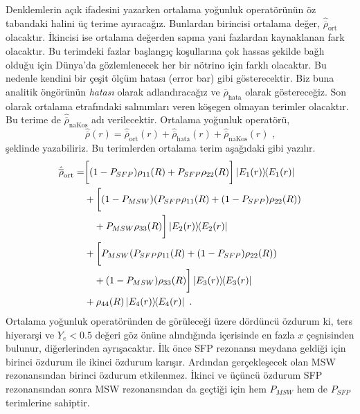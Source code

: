 Denklemlerin açık ifadesini yazarken ortalama yoğunluk operatörünün öz tabandaki halini üç terime ayıracağız. Bunlardan birincisi ortalama değer, $ \hat{\overline{\rho}}_{\text{ort}} $ olacaktır. İkincisi ise ortalama değerden sapma yani fazlardan kaynaklanan fark olacaktır. Bu terimdeki fazlar başlangıç koşullarına çok hassas şekilde bağlı olduğu için Dünya'da gözlemlenecek her bir nötrino için farklı olacaktır. Bu nedenle kendini bir çeşit ölçüm hatası (error bar) gibi gösterecektir. Biz buna analitik öngörünün \emph{hatası} olarak adlandıracağız ve $ \hat{\overline{\rho}}_{\text{hata}} $ olarak göstereceğiz. Son olarak ortalama etrafındaki salınımları veren köşegen olmayan terimler olacaktır. Bu terime de $ \hat{\overline{\rho}}_{\text{naKos}} $ adı verilecektir. Ortalama yoğunluk operatörü,
\begin{equation} \label{eqn:ortYogun1}
    \hat{\overline{\rho}}(r) = \hat{\overline{\rho}}_{\text{ort}}(r) + \hat{\overline{\rho}}_{\text{hata}}(r) + \hat{\overline{\rho}}_{\text{naKos}}(r) \text{ ,}
\end{equation}
şeklinde yazabiliriz. Bu terimlerden ortalama terim aşağıdaki gibi yazılır.
\begin{align}\label{eqn:rhoBar_ort}
    \nonumber\hat{\overline{\rho}}_{\text{ort}}=& \bigg[(1-P_{SFP}) \rho_{11}(R)+ P_{SFP} \rho_{22}(R)\bigg] \dyad{E_{1}(r)}{E_{1}(r)}\\
    \nonumber&+ \bigg[\qty(1-P_{MSW})\qty(P_{SFP}\rho_{11}(R) +(1-P_{SFP})\rho_{22}(R))\\
    \nonumber&~~~+ P_{MSW} \rho_{33}(R)\bigg] \dyad{E_{2}(r)}{E_{2}(r)}\\
    \nonumber&+ \bigg[P_{MSW}\qty(P_{SFP}\rho_{11}(R)+ (1-P_{SFP})\rho_{22}(R))\\
    \nonumber&~~~+(1-P_{MSW})\rho_{33}(R)\bigg] \dyad{E_{3}(r)}{E_{3}(r)}\\
    &+ \rho_{44}(R) \dyad{E_{4}(r)}{E_{4}(r)} \text{ .}
\end{align}
Ortalama yoğunluk operatöründen de görüleceği üzere dördüncü özdurum ki, ters hiyerarşi ve $ Y_{e}<0.5 $ değeri göz önüne alındığında içerisinde en fazla $ x $ çeşnisinden bulunur,  diğerlerinden ayrışacaktır. İlk önce SFP rezonansı meydana geldiği için birinci özdurum ile ikinci özdurum karışır. Ardından gerçekleşecek olan MSW rezonansından birinci özdurum etkilenmez. İkinci ve üçüncü özdurum SFP rezonansından sonra MSW rezonansından da geçtiği için hem $ P_{MSW} $ hem de $ P_{SFP} $ terimlerine sahiptir. 


